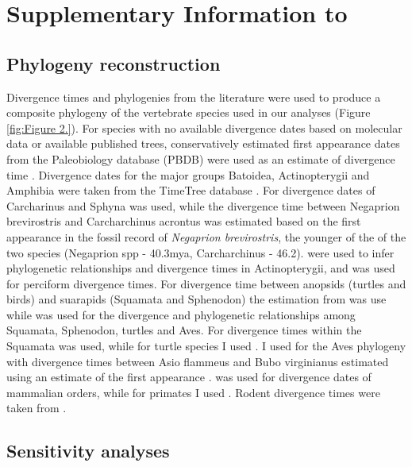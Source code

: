 \chapter{Supplementary Information to }%
\label{chap:Appendix A}
\section{Phylogeny reconstruction}

Divergence times and phylogenies from the literature were used to produce a composite phylogeny of the vertebrate species used in our analyses (Figure \ref{fig:Figure 2.}). For species with no available divergence dates based on molecular data or available published trees, conservatively estimated first appearance dates from the Paleobiology database (PBDB) were used as an estimate of divergence time \citep{alroy2008phanerozoic}. 
Divergence dates for the major groups Batoidea, Actinopterygii and Amphibia were taken from the TimeTree database \citep{hedges2006timetree}. For divergence dates of Carcharinus and Sphyna \cite{lim2010phylogeny} was used, while the divergence time between Negaprion brevirostris and Carcharchinus acrontus was estimated based on the first appearance in the fossil record of \textit{Negaprion brevirostris}, the younger of the of the two species (Negaprion spp - 40.3mya, Carcharchinus - 46.2). \cite{li2008optimal} were used to infer phylogenetic relationships and divergence times in Actinopterygii, and \cite{little2010evolutionary} was used for perciform divergence times. For divergence time between anopsids (turtles and birds) and suarapids (Squamata and Sphenodon) the estimation from \cite{benton2007paleontological} was use while \cite{perelman2011molecular} was used for the divergence and phylogenetic relationships among Squamata, Sphenodon, turtles and Aves. For divergence times within the Squamata \cite{wiens2006does} was used, while for turtle species I used \cite{naro2008evolutionary}. I used \cite{brown2008strong} for the Aves phylogeny with divergence times between Asio flammeus and Bubo virginianus estimated using an estimate of the first appearance \citep{janossy2011pleistocene}. \citep{murphy2007using} was used for divergence dates of mammalian orders, while for primates I used \cite{perelman2011molecular}. Rodent divergence times were taken from \cite{murphy2007using}.



\section{Sensitivity analyses}

